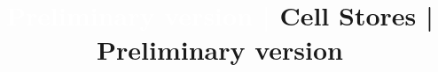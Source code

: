 \documentclass{vldb}
\begin{document}

\title{\textcolor{White}{Preliminary version |} Cell Stores \textcolor[rgb]{0.7,0.7,0.7}{| Preliminary version}}



%
%
%
%

\end{document}

